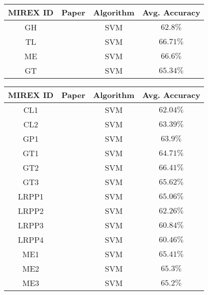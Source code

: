 \label{appendix:mirex}


\begin{center}

  \begin{tabularx}{\textwidth}{c|X|c|c}

    \textbf{MIREX ID} & \textbf{Paper} & \textbf{Algorithm} & \textbf{Avg. Accuracy} \\
    \hline

    GH & \citet{gh_2007} & SVM & $62.8\%$ \\
    TL & \citet{tl_2007} & SVM & $66.71\%$ \\
    ME & \citet{me_2007} & SVM & $66.6\%$ \\
    GT & \citet{gt_2007} & SVM & $65.34\%$ \\

  \end{tabularx}


  \label{tab:mirex2007}

\end{center}

\vspace{1cm}


\begin{center}

  \begin{tabularx}{\textwidth}{c|X|c|c}

    \textbf{MIREX ID} & \textbf{Paper} & \textbf{Algorithm} & \textbf{Avg. Accuracy} \\
    \hline

    CL1 & \citet{cl_2008} & SVM & $62.04\%$ \\
    CL2 & \citet{cl_2008} & SVM & $63.39\%$ \\
    GP1 & \citet{gp_2008} & SVM & $63.9\%$ \\
    GT1 & \citet{gt_2008} & SVM & $64.71\%$ \\
    GT2 & \citet{gt_2008} & SVM & $66.41\%$ \\
    GT3 & \citet{gt_2008} & SVM & $65.62\%$ \\
    LRPP1 & \citet{lrpp_2008} & SVM & $65.06\%$ \\
    LRPP2 & \citet{lrpp_2008} & SVM & $62.26\%$ \\
    LRPP3 & \citet{lrpp_2008} & SVM & $60.84\%$ \\
    LRPP4 & \citet{lrpp_2008} & SVM & $60.46\%$ \\
    ME1 & \citet{me_2008} & SVM & $65.41\%$ \\
    ME2 & \citet{me_2008} & SVM & $65.3\%$ \\
    ME3 & \citet{me_2008} & SVM & $65.2\%$ \\

  \end{tabularx}


  \label{tab:mirex2008}

\end{center}


